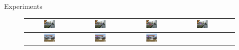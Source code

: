 \documentclass[serif,mathserif,final]{beamer}
\newcommand{\1}{\mathbb{I}} %
\begin{document}
\begin{frame}{}
\begin{columns}[t]
\begin{column}{0.23\linewidth}
\begin{block}{Experiments}
        \begin{figure}
        \setlength\tabcolsep{1pt}
        \centering
        \begin{tabular}{|c|c|c|c|c|}
          \hline
          \includegraphics[width=0.24\textwidth]{car_cnn/1a.png} &   
          \includegraphics[width=0.24\textwidth]{car_cnn/1b.png} &   
          \includegraphics[width=0.24\textwidth]{car_cnn/1c.png} &   
          \includegraphics[width=0.24\textwidth]{car_cnn/1d.png}  \\  
          \hline
          \includegraphics[width=0.24\textwidth]{car_cnn/2a.png} &   
          \includegraphics[width=0.24\textwidth]{car_cnn/2b.png} &   
          \includegraphics[width=0.24\textwidth]{car_cnn/2c.png} &   

\end{tabular}
\end{figure}
\end{block}
\end{column}
\end{columns}
\end{frame}
\end{document}
